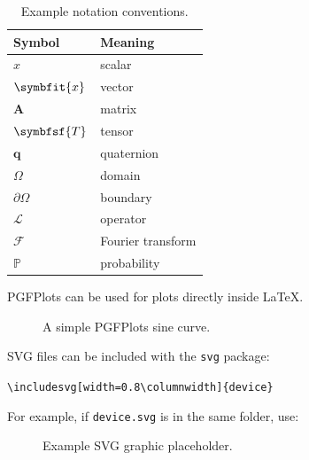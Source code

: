 \documentclass[11pt,twocolumn]{article}
\newcommand{\vct}[1]{\symbfit{#1}}   %
\newcommand{\mat}[1]{\symbf{#1}}     %
\newcommand{\ten}[1]{\symbfsf{#1}}   %
\newcommand{\FT}{\mathcal{F}}
\newcommand{\Prob}{\mathbb{P}}
\newcommand{\quat}[1]{\mathbf{#1}}
\begin{document}
\begin{table}[ht]
\centering
\caption{Example notation conventions.}
\begin{tabular}{ll}
\toprule
Symbol & Meaning \\
\midrule
$x$ & scalar \\
$\vct{x}$ & vector \\
$\mat{A}$ & matrix \\
$\ten{T}$ & tensor \\
$\quat{q}$ & quaternion \\
$\Omega$ & domain \\
$\partial\Omega$ & boundary \\
$\mathcal{L}$ & operator \\
$\FT$ & Fourier transform \\
$\Prob$ & probability \\
\bottomrule
\end{tabular}
\end{table}

PGFPlots can be used for plots directly inside LaTeX.

\begin{figure}[ht]
\centering
{}
\caption{A simple PGFPlots sine curve.}
\end{figure}

SVG files can be included with the \texttt{svg} package:

\begin{center}
\texttt{\textbackslash includesvg[width=0.8\textbackslash columnwidth]\{device\}}
\end{center}

For example, if \texttt{device.svg} is in the same folder, use:

\begin{figure}[ht]
\centering
% 
\caption{Example SVG graphic placeholder.}
\end{figure}
\end{document}
